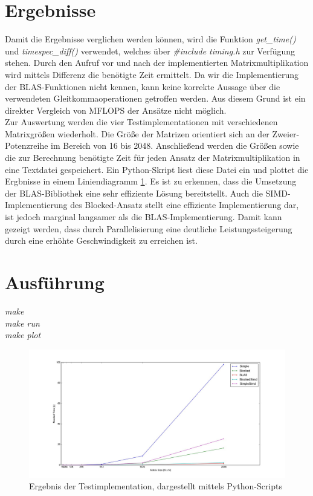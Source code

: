 \documentclass[]{article}
\begin{document}
\section*{Ergebnisse}
Damit die Ergebnisse verglichen werden können, wird die Funktion \textit{get\_time()} und \textit{timespec\_diff()} verwendet, welches über \textit{\#include \glqq timing.h\grqq} zur Verfügung stehen. Durch den Aufruf vor und nach der implementierten Matrixmultiplikation wird mittels Differenz die benötigte Zeit ermittelt. Da wir die Implementierung der BLAS-Funktionen nicht kennen, kann keine korrekte Aussage über die verwendeten Gleitkommaoperationen getroffen werden. Aus diesem Grund ist ein direkter Vergleich von MFLOPS der Ansätze nicht möglich. \\
Zur Auswertung werden die vier Testimplementationen mit verschiedenen Matrixgrößen wiederholt. Die Größe der Matrizen orientiert sich an der Zweier-Potenzreihe im Bereich von 16 bis 2048. Anschließend werden die Größen sowie die zur Berechnung benötigte Zeit für jeden Ansatz der Matrixmultiplikation in eine Textdatei gespeichert. Ein Python-Skript liest diese Datei ein und plottet die Ergbnisse in einem Liniendiagramm \ref{pic:ergebnis}. Es ist zu erkennen, dass die Umsetzung der BLAS-Bibliothek eine sehr effiziente Lösung bereitstellt. Auch die SIMD-Implementierung des Blocked-Ansatz stellt eine effiziente Implementierung dar, ist jedoch marginal langsamer als die BLAS-Implementierung. Damit kann gezeigt werden, dass durch Parallelisierung eine deutliche Leistungssteigerung durch eine erhöhte Geschwindigkeit zu erreichen ist.

\section*{Ausführung}
\textit{make}\\
\textit{make run}\\
\textit{make plot}

\begin{figure}[h]
	\centering
	\includegraphics[width=1\linewidth]{ergebnis.jpg}
	\caption{Ergebnis der Testimplementation, dargestellt mittels Python-Scripts}
	\label{pic:ergebnis}
\end{figure}
\end{document}
